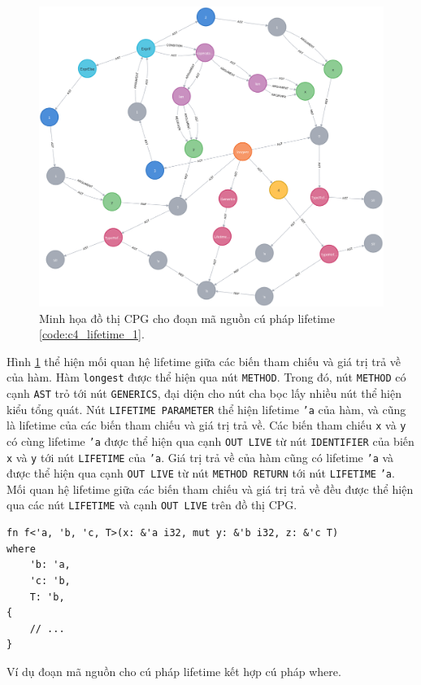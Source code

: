 \begin{figure}[H]
    \includegraphics[width=1\columnwidth]{figures/c4/c4_lifetime_1.png}
    \centering
    \caption{Minh họa đồ thị CPG cho đoạn mã nguồn cú pháp lifetime \ref{code:c4_lifetime_1}.}
    \label{img:c4_lifetime_1}
\end{figure}

Hình \ref{img:c4_lifetime_1} thể hiện mối quan hệ lifetime giữa các biến tham chiếu và giá trị trả về của hàm.
Hàm \texttt{longest} được thể hiện qua nút \texttt{METHOD}.
Trong đó, nút \texttt{METHOD} có cạnh \texttt{AST} trỏ tới nút \texttt{GENERICS}, đại diện cho nút cha bọc lấy nhiều nút thể hiện kiểu tổng quát.
Nút \texttt{LIFETIME PARAMETER} thể hiện lifetime \texttt{'a} của hàm, và cũng là lifetime của các biến tham chiếu và giá trị trả về.
Các biến tham chiếu \texttt{x} và \texttt{y} có cùng lifetime \texttt{'a} được thể hiện qua cạnh \texttt{OUT LIVE} từ nút \texttt{IDENTIFIER} của biến \texttt{x} và \texttt{y} tới nút \texttt{LIFETIME} của \texttt{'a}.
Giá trị trả về của hàm cũng có lifetime \texttt{'a} và được thể hiện qua cạnh \texttt{OUT LIVE} từ nút \texttt{METHOD RETURN} tới nút \texttt{LIFETIME} \texttt{'a}.
Mối quan hệ lifetime giữa các biến tham chiếu và giá trị trả về đều được thể hiện qua các nút \texttt{LIFETIME} và cạnh \texttt{OUT LIVE} trên đồ thị CPG.

\begin{listing}[H]
\begin{verbatim}
fn f<'a, 'b, 'c, T>(x: &'a i32, mut y: &'b i32, z: &'c T)
where
    'b: 'a,
    'c: 'b,
    T: 'b,
{
    // ...
}
\end{verbatim}
\caption{Ví dụ đoạn mã nguồn cho cú pháp lifetime kết hợp cú pháp where.}
\label{code:c4_lifetime_2}
\end{listing}


